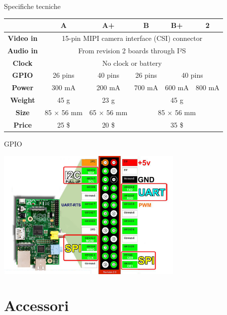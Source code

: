 \documentclass[xcolor=svgnames,11pt]{beamer}
\begin{document}
\begin{frame}[fragile]{Specifiche tecniche}
\begin{center}
\begin{tabular}{|c|c|c|c|c|c|}
\hline
 & \textbf{A} & \textbf{A+} & \textbf{B} & \textbf{B+} & \textbf{2} \\
\hline
\textbf{Video in} & \multicolumn{5}{c|}{{\tiny 15-pin MIPI camera interface (CSI) connector}} \\
\hline
\textbf{Audio in} & \multicolumn{5}{c|}{{\tiny From revision 2 boards through I²S}} \\
\hline
\textbf{Clock} & \multicolumn{5}{c|}{{\tiny No clock or battery}} \\
\hline 
\textbf{GPIO} & {\tiny 26 pins} & {\tiny 40 pins} & {\tiny 26 pins} & \multicolumn{2}{c|}{{\tiny 40 pins}} \\
\hline
\textbf{Power} & {\tiny 300 mA} & {\tiny 200 mA} & {\tiny 700 mA} & {\tiny 600 mA} & {\tiny 800 mA} \\
\hline
\textbf{Weight} & {\tiny 45 g} & {\tiny 23 g} & \multicolumn{3}{c|}{{\tiny 45 g}} \\
\hline
\textbf{Size} & {\tiny 85 × 56 mm } & {\tiny 65 × 56 mm } & \multicolumn{3}{c|}{{\tiny 85 × 56 mm}} \\
\hline
\textbf{Price} & {\tiny 25 \$} & {\tiny 20 \$} & \multicolumn{3}{c|}{{\tiny 35 \$}} \\
\hline
\end{tabular}
\end{center}
\end{frame}

\begin{frame}{GPIO}
\begin{center}
\includegraphics[width=9cm]{gpio.jpg}
\end{center}
\end{frame}

\section{Accessori}
\end{document}

